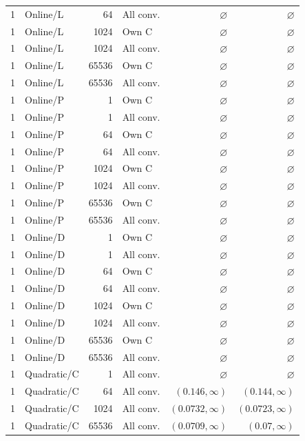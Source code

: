 \begin{longtable}{llrlrr}
1 & Online/L & 64 & All conv. & $\varnothing$ & $\varnothing$ \\
1 & Online/L & 1024 & Own C & $\varnothing$ & $\varnothing$ \\
1 & Online/L & 1024 & All conv. & $\varnothing$ & $\varnothing$ \\
1 & Online/L & 65536 & Own C & $\varnothing$ & $\varnothing$ \\
1 & Online/L & 65536 & All conv. & $\varnothing$ & $\varnothing$ \\
1 & Online/P & 1 & Own C & $\varnothing$ & $\varnothing$ \\
1 & Online/P & 1 & All conv. & $\varnothing$ & $\varnothing$ \\
1 & Online/P & 64 & Own C & $\varnothing$ & $\varnothing$ \\
1 & Online/P & 64 & All conv. & $\varnothing$ & $\varnothing$ \\
1 & Online/P & 1024 & Own C & $\varnothing$ & $\varnothing$ \\
1 & Online/P & 1024 & All conv. & $\varnothing$ & $\varnothing$ \\
1 & Online/P & 65536 & Own C & $\varnothing$ & $\varnothing$ \\
1 & Online/P & 65536 & All conv. & $\varnothing$ & $\varnothing$ \\
1 & Online/D & 1 & Own C & $\varnothing$ & $\varnothing$ \\
1 & Online/D & 1 & All conv. & $\varnothing$ & $\varnothing$ \\
1 & Online/D & 64 & Own C & $\varnothing$ & $\varnothing$ \\
1 & Online/D & 64 & All conv. & $\varnothing$ & $\varnothing$ \\
1 & Online/D & 1024 & Own C & $\varnothing$ & $\varnothing$ \\
1 & Online/D & 1024 & All conv. & $\varnothing$ & $\varnothing$ \\
1 & Online/D & 65536 & Own C & $\varnothing$ & $\varnothing$ \\
1 & Online/D & 65536 & All conv. & $\varnothing$ & $\varnothing$ \\
1 & Quadratic/C & 1 & All conv. & $\varnothing$ & $\varnothing$ \\
1 & Quadratic/C & 64 & All conv. & $(0.146, \infty)$ & $(0.144, \infty)$ \\
1 & Quadratic/C & 1024 & All conv. & $(0.0732, \infty)$ & $(0.0723, \infty)$ \\
1 & Quadratic/C & 65536 & All conv. & $(0.0709, \infty)$ & $(0.07, \infty)$ \\

\end{longtable}
